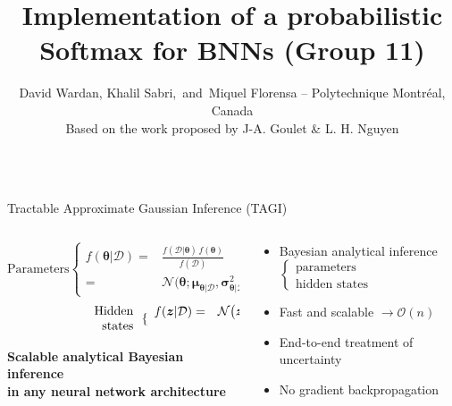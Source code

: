 \documentclass[final]{beamer}
\title{Implementation of a probabilistic Softmax for BNNs (Group 11)}
\author{  David Wardan, Khalil Sabri, \,and\, Miquel Florensa  -- Polytechnique Montr\'{e}al, Canada \\ \vspace{5mm} \Large Based on the work proposed by J-A. Goulet \& L. H. Nguyen}
\institute[shortinst]{}
\begin{document}
\begin{frame}[t]

\begin{columns}
\begin{column}[T]{.31\textwidth}

\begin{alertblock}{\Large Tractable Approximate Gaussian Inference (TAGI)}
\vspace{4pt}
\begin{columns}
\begin{column}{.5\textwidth}\vspace{23pt}
\centering
$$\text{Parameters}\left\{\begin{array}{rl}f(\bm\theta|\mathcal{D}) =&\displaystyle \frac{f(\mathcal{D}|\bm\theta)\,f(\bm\theta)}{f(\mathcal{D})}\\[25pt]
=&\mathcal{N}\big(\bm{\theta};\bm{\mu}_{\bm{\theta}|\mathcal{D}},\bm{\sigma}^2_{\bm{\theta}|\mathcal{D}}\mathbf{I})\end{array}\right.$$
$$\hspace{22.5mm}\begin{array}{r}\text{Hidden}\\\text{states}\end{array}\left\{\begin{array}{rl}~\\[-20pt]f(\bm{z}|\mathcal{D}) =&\mathcal{N}\big(\bm{z};\bm{\mu}_{\bm{Z}|\mathcal{D}},\bm{\sigma}^2_{\bm{Z}|\mathcal{D}}\mathbf{I})\\[-10pt]
&~\end{array}\right.$$


\alert{\bf Scalable analytical Bayesian inference\\ in any neural network architecture}
\end{column}
\begin{column}{.5\textwidth}


\begin{itemize}\setlength\itemsep{0.5em}
\item Bayesian analytical inference $\left\{\begin{array}{ll} \text{parameters}\\
\text{hidden states}\end{array}\right.$\vspace{-5.5mm}
\item Fast and scalable $\to \mathcal{O}(n)$
\item End-to-end treatment of uncertainty
\item No gradient backpropagation
\end{itemize}
\end{column}
\end{columns}\bigskip
\end{alertblock}


\end{column}
\end{columns}
\end{frame}
\end{document}
